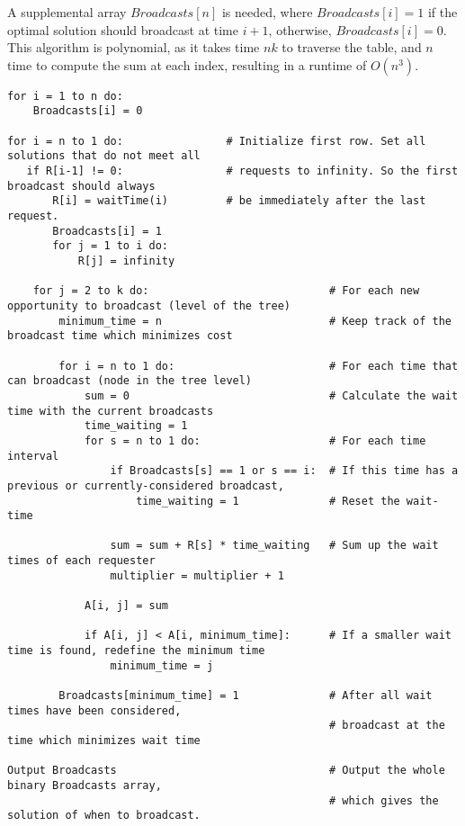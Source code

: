 \documentclass[letterpaper,notitlepage,twoside]{article}
\begin{document}
A supplemental array $Broadcasts[n]$ is needed, where $Broadcasts[i] = 1$ if the optimal solution should broadcast at time $i + 1$, otherwise, $Broadcasts[i] = 0$.
This algorithm is polynomial, as it takes time $nk$ to traverse the table, and $n$ time to compute the sum at each index, resulting in a runtime of $O(n^3)$.
\begin{verbatim}
for i = 1 to n do:
    Broadcasts[i] = 0

for i = n to 1 do:                # Initialize first row. Set all solutions that do not meet all 
   if R[i-1] != 0:                # requests to infinity. So the first broadcast should always
       R[i] = waitTime(i)         # be immediately after the last request.
       Broadcasts[i] = 1
       for j = 1 to i do:
           R[j] = infinity         

    for j = 2 to k do:                            # For each new opportunity to broadcast (level of the tree)
        minimum_time = n                          # Keep track of the broadcast time which minimizes cost
        
        for i = n to 1 do:                        # For each time that can broadcast (node in the tree level)        
            sum = 0                               # Calculate the wait time with the current broadcasts
            time_waiting = 1
            for s = n to 1 do:                    # For each time interval
                if Broadcasts[s] == 1 or s == i:  # If this time has a previous or currently-considered broadcast,
                    time_waiting = 1              # Reset the wait-time
                
                sum = sum + R[s] * time_waiting   # Sum up the wait times of each requester
                multiplier = multiplier + 1
                
            A[i, j] = sum
            
            if A[i, j] < A[i, minimum_time]:      # If a smaller wait time is found, redefine the minimum time
                minimum_time = j
        
        Broadcasts[minimum_time] = 1              # After all wait times have been considered,
                                                  # broadcast at the time which minimizes wait time

Output Broadcasts                                 # Output the whole binary Broadcasts array,
                                                  # which gives the solution of when to broadcast.
\end{verbatim}
\end{document}
